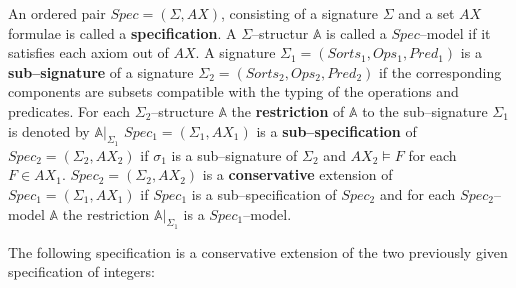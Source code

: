 \documentclass[landscape, autoslides, light]{mmiss}
\begin{document}
\begin{Package}[Label={FSDPT}, Title={Formal Specification of Data and Process Types}, ShortTitle={FSDPT}, Authors={Horst Reichel}, Date={February 2003}, LevelOfDetail=Lecture, Language=en-GB]
\begin{Section}[Title={Initial Algebras as Data Types}, Label={section3}]
\begin{Section}[Title={Functional Enrichment of Data Types}, Label={section3_3}]
\begin{Paragraph}[Title={Equivalence of Specifications}, Label=Paragraph54]
\begin{Definition}[Title = {Initial Algebras as Data Types}, Label = {Definition1}]
\begin{List}[ListType=enumerate]
    \ListItem An ordered pair $Spec = (\Sigma, AX)$, consisting of a
signature $\Sigma$ and a set $AX$ formulae is called a
\textbf{specification}. A $\Sigma$--structur $ \mathbb{A}$ is
called a $Spec$--model if it satisfies each axiom out of $AX$.
\pause
 \ListItem A signature $\Sigma_1 = ( Sorts_1, Ops_1, Pred_1)$ is
a \textbf{sub--signature} of a signature $\Sigma_2 = ( Sorts_2,
Ops_2, Pred_2)$ if the corresponding components are subsets
compatible with the typing of the operations and predicates. For
each $\Sigma_2$--structure $ \mathbb{A}$ the \textbf{restriction}
of $ \mathbb{A}$ to the sub--signature $\Sigma_1$ is denoted by $
\mathbb{A}|_{\Sigma_{1}}$
 \pause
  \ListItem $Spec_1 = (\Sigma_1, AX_1)$
is a \textbf{sub--specification} of $Spec_2 = (\Sigma_2, AX_2)$ if
$\sigma_1$ is a sub--signature of $\Sigma_2$ and $AX_2 \models F $
for each $F \in  AX_1$.
 \pause
 \ListItem  $Spec_2 = (\Sigma_2, AX_2)$ is a \textbf{conservative} extension
 of $Spec_1 = (\Sigma_1, AX_1)$ if $Spec_1$ is a
 sub--specification of $Spec_2$ and for each $Spec_2$--model
 $\mathbb{A}$ the restriction $\mathbb{A}|_{\Sigma_{1}}$ is a
 $Spec_1$--model.
\end{List}
\end{Definition}
\pause
 \vspace{2cm}
 The following specification  is a conservative extension of the
two previously given specification of integers:


\end{Paragraph}
\begin{Paragraph}[Label=Paragraph55]
\footnotesize



\end{Paragraph}
\end{Section}
\end{Section}
\end{Package}
\end{document}
